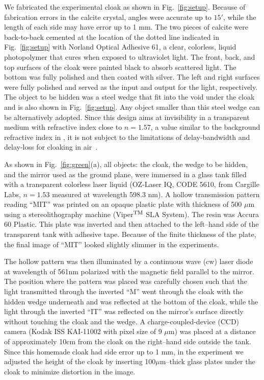 \documentclass[preprint,preprintnumbers,amsmath,amssymb]{revtex4}
\begin{document}
We fabricated the experimental cloak as shown in
Fig.~\ref{fig:setup}. Because of fabrication errors in the calcite
crystal, angles were accurate up to $15'$, while the length of each
side may have error up to 1 mm. The two pieces of calcite were
back-to-back cemented at the location of the dotted line indicated
in Fig.~\ref{fig:setup} with Norland Optical Adhesive 61, a clear,
colorless, liquid photopolymer that cures when exposed to
ultraviolet light. The front, back, and top surfaces of the cloak
were painted black to absorb scattered light. The bottom was fully
polished and then coated with silver. The left and right surfaces
were fully polished and served as the input and output for the
light, respectively. The object to be hidden was a steel wedge that
fit into the void under the cloak and is also shown in
Fig.~\ref{fig:setup}. Any object smaller than this steel wedge can
be alternatively adopted. Since this design aims at invisibility in
a transparent medium with refractive index close to $n=1.57$, a
value similar to the background refractive index in
\cite{valentine}, it is not subject to the limitations of
delay-bandwidth and delay-loss for cloaking in air~\cite{hashemi}.

As shown in Fig.~\ref{fig:green}(a), all objects: the cloak, the
wedge to be hidden, and the mirror used as the ground plane, were
immersed in a glass tank filled with a transparent colorless laser
liquid (OZ-Laser IQ, CODE 5610, from Cargille Labs, $n=1.53$
measured at wavelength 598.3 nm). A hollow transmission pattern
reading ``MIT'' was printed on an opaque plastic plate with
thickness of 500 $\mu$m using a stereolithography machine
(Viper$^{\rm TM}$ SLA System). The resin was Accura 60 Plastic. This
plate was inverted and then attached to the left--hand side of the
transparent tank with adhesive tape. Because of the finite thickness
of the plate, the final image of ``MIT'' looked slightly slimmer in
the experiments.

The hollow pattern was then illuminated by a continuous wave (cw)
laser diode at wavelength of 561nm polarized with the magnetic field
parallel to the mirror. The position where the pattern was placed
was carefully chosen such that the light transmitted through the
inverted ``M'' went through the cloak with the hidden wedge
underneath and was reflected at the bottom of the cloak, while the
light through the inverted ``IT'' was reflected on the mirror's
surface directly without touching the cloak and the wedge. A
charge-coupled-device (CCD) camera (Kodak ISS KAI-11002 with pixel
size of 9 $\mu$m) was placed at a distance of approximately 10cm
from the cloak on the right--hand side outside the tank. Since this
homemade cloak had side error up to 1 mm, in the experiment we
adjusted the height of the cloak by inserting 100$\mu$m--thick glass
plates under the cloak to minimize distortion in the image.
\end{document}
